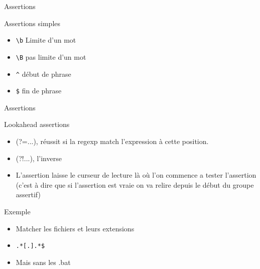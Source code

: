 \def\ftitle{Assertions}

\begin{frame}[containsverbatim]{\ftitle}
\def\blocktitle{Assertions simples}
\begin{block}{\blocktitle}
\begin{itemize}
\item \verb!\b! Limite d'un mot
\item \verb!\B! pas limite d'un mot
\item \verb!^! début de phrase
\item \verb!$! fin de phrase %
\end{itemize}
\end{block}
\end{frame}

\begin{frame}[containsverbatim]{\ftitle}
\def\blocktitle{Lookahead assertions}
\begin{block}{\blocktitle}
\begin{itemize}
\item (?=...), réussit si la regexp match l'expression à cette position.
\item (?!...), l'inverse
\item L'assertion laisse le curseur de lecture là où l'on commence a tester l'assertion (c'est à dire que si l'assertion est vraie on va relire depuis le début du groupe assertif)
\end{itemize}
\end{block}
\def\blocktitle{Exemple}
\begin{block}{\blocktitle}
\begin{itemize}
\item Matcher les fichiers et leurs extensions
\item \verb!.*[.].*$! %
\item Mais sans les .bat
\end{itemize}
\end{block}
\end{frame}


